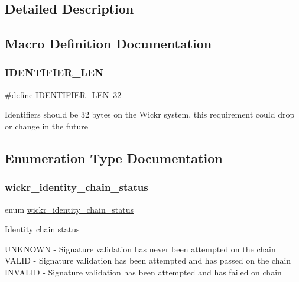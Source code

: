 \subsection{Detailed Description}


\subsection{Macro Definition Documentation}
\mbox{\label{group__wickr__identity_ga43bd60836203349a1c745d0d29bf7706}} 
\subsubsection{\texorpdfstring{I\+D\+E\+N\+T\+I\+F\+I\+E\+R\+\_\+\+L\+EN}{IDENTIFIER\_LEN}}
{\footnotesize\ttfamily \#define I\+D\+E\+N\+T\+I\+F\+I\+E\+R\+\_\+\+L\+EN~32}

Identifiers should be 32 bytes on the Wickr system, this requirement could drop or change in the future 

\subsection{Enumeration Type Documentation}
\mbox{\label{group__wickr__identity_ga78aefa3835eb13ca75c0129583b5ebfa}} 
\subsubsection{\texorpdfstring{wickr\+\_\+identity\+\_\+chain\+\_\+status}{wickr\_identity\_chain\_status}}
{\footnotesize\ttfamily enum \mbox{\hyperlink{group__wickr__identity_ga78aefa3835eb13ca75c0129583b5ebfa}{wickr\+\_\+identity\+\_\+chain\+\_\+status}}}

Identity chain status

U\+N\+K\+N\+O\+WN -\/ Signature validation has never been attempted on the chain V\+A\+L\+ID -\/ Signature validation has been attempted and has passed on the chain I\+N\+V\+A\+L\+ID -\/ Signature validation has been attempted and has failed on chain 

